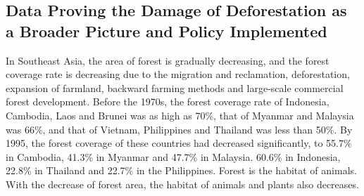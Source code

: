 \documentclass{book}\usepackage{knitr}
\begin{document}
\begin{knitrout}
\begin{kframe}
{\section{Data Proving the Damage of Deforestation as a Broader Picture and Policy Implemented}
In Southeast Asia, the area of forest is gradually decreasing, and the forest coverage rate is decreasing due to the migration and reclamation, deforestation, expansion of farmland, backward farming methods and large-scale commercial forest development. Before the 1970s, the forest coverage rate of Indonesia, Cambodia, Laos and Brunei was as high as 70\%, that of Myanmar and Malaysia was 66\%, and that of Vietnam, Philippines and Thailand was less than 50\%. By 1995, the forest coverage of these countries had decreased significantly, to 55.7\% in Cambodia, 41.3\% in Myanmar and 47.7\% in Malaysia. 60.6\% in Indonesia, 22.8\% in Thailand and 22.7\% in the Philippines. Forest is the habitat of animals. With the decrease of forest area, the habitat of animals and plants also decreases.
}
\end{kframe}
\end{knitrout}
\end{document}
